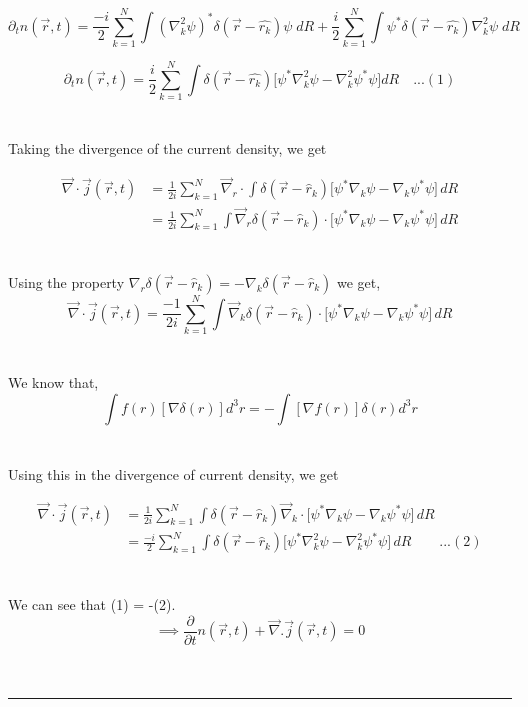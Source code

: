 \documentclass[12pt]{article}
\begin{document}
\[ \partial_t n(\vec{r},t) = \frac{-i}{2} \sum_{k=1}^{N} \int (\nabla^2_k \psi)^* \delta(\vec{r} - \hat{r_k}) 
\psi \; dR + \frac{i}{2} \sum_{k=1}^{N} \int \psi^* \delta(\vec{r} - \hat{r_k}) \nabla^2_k \psi \;dR\]

\[ \partial_t n(\vec{r},t) = \frac{i}{2} \sum_{k=1}^{N} \int \delta(\vec{r} - \hat{r_k}) \big[ \psi^* \nabla^2_k 
\psi - \nabla^2_k \psi^* \psi \big] dR \quad ...(1)\]
\\
\\
Taking the divergence of the current density, we get 

\begin{align*}    
\vec{\nabla} \cdot \vec{j}(\vec{r},t) 
&= \frac{1}{2i} \sum_{k=1}^{N} \vec{\nabla}_r \cdot \int \delta(\vec{r} - \hat{r}_k) 
\big[ \psi^* \nabla_k \psi - \nabla_k \psi^* \psi \big] \, dR \\[6pt]
&= \frac{1}{2i} \sum_{k=1}^{N} \int 
\vec{\nabla}_r \delta(\vec{r} - \hat{r}_k) \cdot 
\big[ \psi^* \nabla_k \psi - \nabla_k \psi^* \psi \big] \, dR
\end{align*}
\\
\\
Using the property $\nabla_r \delta(\vec{r}-\hat{r}_k) =-\nabla_k \delta(\vec{r}-\hat{r}_k) $ we get,
\[ \vec{\nabla} \cdot \vec{j}(\vec{r},t) = \frac{-1}{2i} \sum_{k=1}^{N} \int \vec{\nabla}_k \delta(\vec{r} - \hat{r}_k) \cdot 
\big[ \psi^* \nabla_k \psi - \nabla_k \psi^* \psi \big] \, dR \]
\\
\\
We know that, 
\[ \int f(r) [\nabla \delta(r)] d^3r = - \int [\nabla f(r)] \delta(r) d^3r\]
\\
\\
Using this in the divergence of current density, we get

\begin{align*}
\vec{\nabla} \cdot \vec{j}(\vec{r},t) 
&= \frac{1}{2i} \sum_{k=1}^{N} \int 
 \delta(\vec{r} - \hat{r}_k) \vec{\nabla}_k \cdot 
\big[ \psi^* \nabla_k \psi - \nabla_k \psi^* \psi \big] \, dR \\[6pt]
&= \frac{-i}{2} \sum_{k=1}^{N} \int 
 \delta(\vec{r} - \hat{r}_k) 
\big[ \psi^* \nabla_k^2 \psi - \nabla_k^2 \psi^* \psi \big] \, dR  \qquad ...(2)
\end{align*}
\\
\\
We can see that (1) = -(2). 
\[ \implies \frac{\partial}{\partial t}n(\vec{r},t) + \vec{\nabla}.  \vec{j}(\vec{r},t) = 0 \]
\\
\\
\hrule
\end{document}
